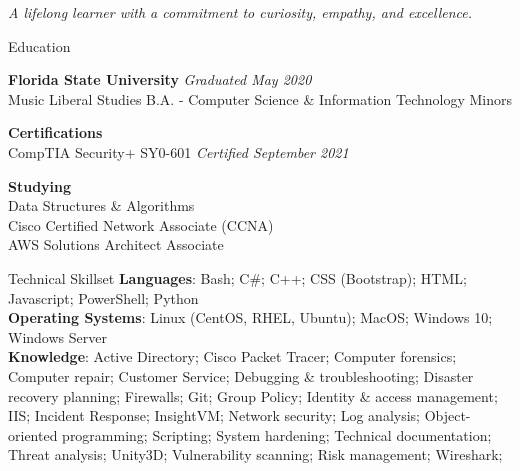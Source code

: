 \documentclass{resume} %
\begin{document}
	\begin{center} \vspace{-0.2cm} {\em  A lifelong learner with a commitment to curiosity, empathy, and excellence.}\end{center}
	\begin{rSection}{Education}
		
		{\bf Florida State University} \hfill {\em Graduated May 2020} \\
		Music Liberal Studies B.A. - Computer Science \& Information Technology Minors
		
		{\bf Certifications} \hfill {\em } \\
		CompTIA Security+ SY0-601 \hfill {\em Certified  September 2021}
		
		{\bf Studying}\\
		Data Structures \& Algorithms\\
		Cisco Certified Network Associate (CCNA)\\
		AWS Solutions Architect Associate		
		
	\end{rSection}
	
	
	
	\begin{rSection}{Technical Skillset}
		\textbf{Languages}: Bash; C\#; C++; CSS (Bootstrap); HTML; Javascript; PowerShell; Python \\
		\textbf{Operating Systems}: Linux (CentOS, RHEL, Ubuntu); MacOS; Windows 10; Windows Server \\
		\textbf{Knowledge}: Active Directory; Cisco Packet Tracer; Computer forensics; Computer repair; Customer Service; Debugging \& troubleshooting; Disaster recovery planning; Firewalls; Git; Group Policy; Identity \& access management; IIS; Incident Response; InsightVM; Network security; Log analysis; Object-oriented programming; Scripting; System hardening; Technical documentation; Threat analysis; Unity3D; Vulnerability scanning; Risk management; Wireshark;
	\end{rSection}
	
	
	
\end{document}

